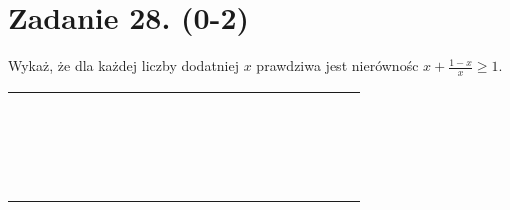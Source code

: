 \documentclass[10pt]{article}
\begin{document}
\section*{Zadanie 28. (0-2)}
Wykaż, że dla każdej liczby dodatniej \(x\) prawdziwa jest nierównośc \(x+\frac{1-x}{x} \geq 1\).

\begin{center}
\begin{tabular}{|c|c|c|c|c|c|c|c|c|c|c|c|c|c|c|c|c|c|c|c|c|c|}
\hline
 &  &  &  &  &  &  &  &  &  &  &  &  &  &  &  &  &  &  &  &  &  \\
\hline
 &  &  &  &  &  &  &  &  &  &  &  &  &  &  &  &  &  &  &  &  &  \\
\hline
 &  &  &  &  &  &  &  &  &  &  &  &  &  &  &  &  &  &  &  &  &  \\
\hline
 &  &  &  &  &  &  &  &  &  &  &  &  &  &  &  &  &  &  &  &  &  \\
\hline
 &  &  &  &  &  &  &  &  &  &  &  &  &  &  &  &  &  &  &  &  &  \\
\hline
 &  &  &  &  &  &  &  &  &  &  &  &  &  &  &  &  &  &  &  &  &  \\
\hline
 &  &  &  &  &  &  &  &  &  &  &  &  &  &  &  &  &  &  &  &  &  \\
\hline
 &  &  &  &  &  &  &  &  &  &  &  &  &  &  &  &  &  &  &  &  &  \\
\hline
 &  &  &  &  &  &  &  &  &  &  &  &  &  &  &  &  &  &  &  &  &  \\
\hline
 &  &  &  &  &  &  &  &  &  &  &  &  &  &  &  &  &  &  &  &  &  \\
\hline
 &  &  &  &  &  &  &  &  &  &  &  &  &  &  &  &  &  &  &  &  &  \\
\hline
 &  &  &  &  &  &  &  &  &  &  &  &  &  &  &  &  &  &  &  &  &  \\
\hline
 &  &  &  &  &  &  &  &  &  &  &  &  &  &  &  &  &  &  &  &  &  \\
\hline
 &  &  &  &  &  &  &  &  &  &  &  &  &  &  &  &  &  &  &  &  &  \\
\hline
 &  &  &  &  &  &  &  &  &  &  &  &  &  &  &  &  &  &  &  &  &  \\
\hline
 &  &  &  &  &  &  &  &  &  &  &  &  &  &  &  &  &  &  &  &  &  \\
\hline
 &  &  &  &  &  &  &  &  &  &  &  &  &  &  &  &  &  &  &  &  &  \\
\hline
 &  &  &  &  &  &  &  &  &  &  &  &  &  &  &  &  &  &  &  &  &  \\
\hline
 &  &  &  &  &  &  &  &  &  &  &  &  &  &  &  &  &  &  &  &  &  \\

\end{tabular}
\end{center}
\end{document}
